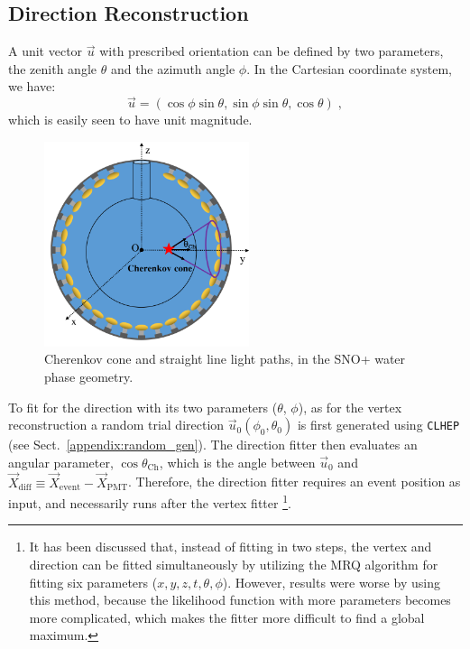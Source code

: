 \subsection{Direction Reconstruction}\label{sect:waterDirection}

A unit vector $\vec{u}$ with prescribed orientation can be defined by two parameters, the zenith angle $\theta$ and the azimuth angle $\phi$. In the Cartesian coordinate system, we have: 
\begin{equation}
\vec{u}=(\cos\phi\sin\theta,\sin\phi\sin\theta,\cos\theta) \;, 
\end{equation}
which is easily seen to have unit magnitude.

\begin{figure}[htbp]
	\centering
	\includegraphics[width=6cm]{mpwDiagram2_coord.png}
	\caption[Cherenkov cone and straight line light paths (SNO+ water phase).]{Cherenkov cone and straight line light paths, in the SNO+ water phase geometry.}
	\label{mpwdiagram_direction}
\end{figure}
To fit for the direction with its two parameters ($\theta$, $\phi$), as for the vertex reconstruction a random trial direction $\vec{u}_0(\phi_0,\theta_0)$ is first generated using \texttt{CLHEP} (see Sect.~\ref{appendix:random_gen}). The direction fitter then evaluates an angular parameter, $\cos\theta_{\mathrm{Ch}}$, which is the angle between $\vec{u}_{0}$ and $\vec{X}_{\mathrm{diff}}\equiv \vec{X}_{\mathrm{event}}-\vec{X}_{\mathrm{PMT}}$. Therefore, the direction fitter requires an event position as input, and necessarily runs after the vertex fitter \footnote{It has been discussed that, instead of fitting in two steps, the vertex and direction can be fitted simultaneously by utilizing the MRQ algorithm for fitting six parameters ($x,y,z,t,\theta,\phi$). However, results were worse by using this method, because the likelihood function with more parameters becomes more complicated, which makes the fitter more difficult to find a global maximum.}.

